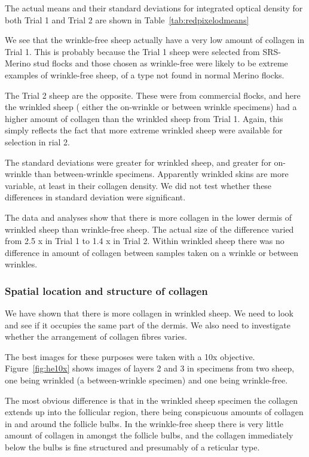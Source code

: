 \documentclass[titlepage]{article}  %
\begin{document}
The actual means and their standard deviations for integrated optical density for both Trial 1 and Trial 2 are shown in Table~\ref{tab:redpixelodmeans}

We see that the wrinkle-free sheep actually have a very low amount of collagen in Trial 1. This is probably because the Trial 1 sheep were selected from SRS-Merino stud flocks and those chosen as wrinkle-free were likely to be extreme examples of wrinkle-free sheep, of a type not found in normal Merino flocks. 

The Trial 2 sheep are the opposite. These were from commercial flocks, and here the wrinkled sheep ( either the on-wrinkle or between wrinkle specimens) had a higher amount of collagen than the wrinkled sheep from Trial 1. Again, this simply reflects the fact that more extreme wrinkled sheep were available for selection in rial 2. 

The standard deviations were greater for wrinkled sheep, and greater for on-wrinkle than between-wrinkle specimens. Apparently wrinkled skins are more variable, at least in their collagen density. We did not test whether these differences in standard deviation were significant.

The data and analyses show that there is more collagen in the lower dermis of wrinkled sheep than wrinkle-free sheep.  The actual size of the difference varied from 2.5 x in Trial 1 to 1.4 x in Trial 2. 
Within wrinkled sheep there was no difference in amount of collagen between samples taken on a wrinkle or between wrinkles.




\subsubsection{Spatial location and structure of collagen}
We have shown that there is more collagen in wrinkled sheep. We need to look and see if it occupies the same part of the dermis. We also need to investigate whether the arrangement of collagen fibres varies.

The best images for these purposes were taken with a 10x objective. Figure~\ref{fig:he10x} shows images of layers 2 and 3 in specimens from two sheep, one being wrinkled (a between-wrinkle specimen) and one being wrinkle-free.

The most obvious difference is that in the wrinkled sheep specimen the collagen extends up into the follicular region, there being conspicuous amounts of collagen in and around the follicle bulbs. In the wrinkle-free sheep there is very little amount of collagen in amongst the follicle bulbs, and the collagen immediately below the bulbs is fine structured and presumably of a reticular type. 
\end{document}
